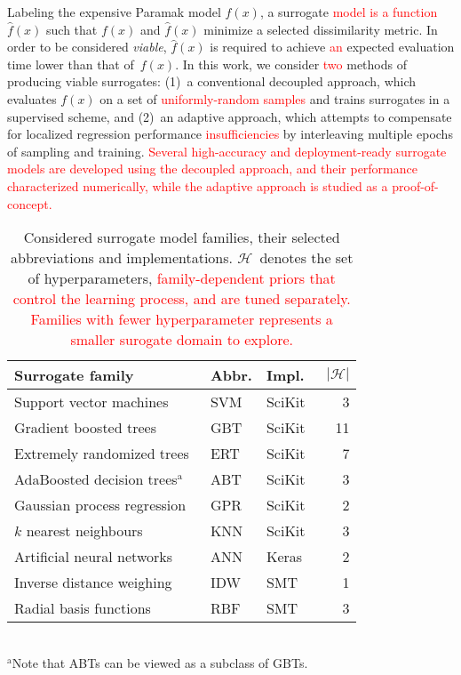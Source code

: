 Labeling the expensive Paramak model $f(x)$, a surrogate \textcolor{red}{model is a function}
$\hat{f}(x)$ such that $f(x)$ and $\hat{f}(x)$ minimize a selected dissimilarity
metric. In order to be considered \textit{viable}, $\hat{f}(x)$ is required to
achieve \textcolor{red}{an} expected evaluation time lower than that of~$f(x)$. In this work, we
consider \textcolor{red}{two} methods of producing viable surrogates: (1)~a conventional decoupled
approach, which evaluates $f(x)$ on a set of \textcolor{red}{uniformly-random samples} and
trains surrogates in a supervised scheme, and (2)~an adaptive approach, which attempts to
compensate for localized regression performance \textcolor{red}{insufficiencies} by interleaving
multiple epochs of sampling and training. \textcolor{red}{Several high-accuracy and deployment-ready surrogate models are developed using the decoupled approach, and their performance characterized numerically, while the adaptive approach is studied as a proof-of-concept.}

\begin{table}[t]
	\setlength\tabcolsep{1pt}
	\renewcommand{\arraystretch}{0.95}
	\caption{\label{tbl:surrogates}Considered surrogate model families, their
		selected abbreviations and implementations. $\mathcal{H}$~denotes the
		set of hyperparameters, \textcolor{red}{family-dependent priors that control the
		learning process, and are tuned separately. Families with fewer
		hyperparameter represents a smaller surogate domain to explore.}}
	\begin{indented}
	\item[]
		\begin{tabular}{lllr}
		\toprule
		Surrogate family & Abbr. & Impl. & $|\mathcal{H}|$ \\
		\midrule
		Support vector machines~\cite{fan2008liblinear}	& SVM & SciKit~\cite{scikit-learn} & 3 \\
		Gradient boosted trees~\cite{friedman2001greedy,friedman1999stochastic,hastie2009elements}	& GBT & SciKit & 11 \\
		Extremely randomized trees~\cite{geurts2006extremely}	& ERT & SciKit & 7 \\
		AdaBoosted decision trees$^\text{a}$~\cite{drucker1997improving}	& ABT & SciKit & 3 \\
		Gaussian process regression~\cite{williams2006gaussian}	& GPR & SciKit & 2 \\
		$k$ nearest neighbours	& KNN & SciKit & 3 \\
		Artificial neural networks	& ANN & Keras~\cite{chollet2015keras} & 2 \\
		Inverse distance weighing~\cite{shepard1968two} & IDW & SMT~\cite{SMT2019} & 1 \\
		Radial basis functions & RBF & SMT & 3 \\
		\bottomrule
		\end{tabular}\\%
		{\footnotesize $^\text{a}$Note that ABTs can be viewed as a subclass of GBTs.}
	\end{indented}
\end{table}

